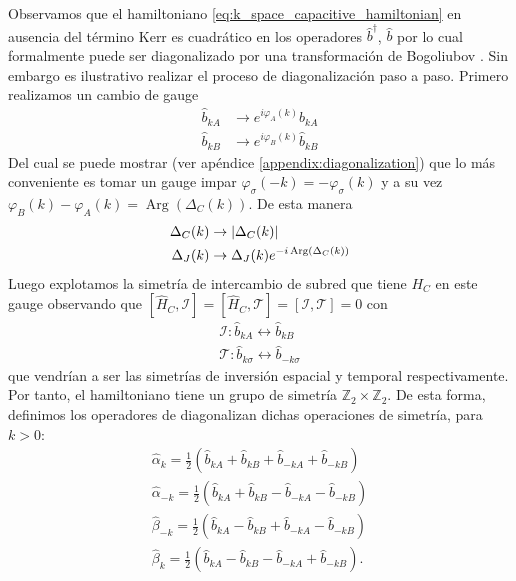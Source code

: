 Observamos que el hamiltoniano \eqref{eq:k_space_capacitive_hamiltonian} en ausencia del término Kerr es cuadrático en los operadores $\hat b^\dag$, $\hat b$ por lo cual formalmente puede ser diagonalizado por una transformación de Bogoliubov \cite{vanHemmen1980}. Sin embargo es ilustrativo realizar el proceso de diagonalización paso a paso. Primero realizamos un cambio de gauge 
\begin{subequations}
    \begin{align}
        \hat b_{kA} &\rightarrow e^{i\varphi_A(k)}\hat b_{kA}\\
        \hat b_{kB} &\rightarrow e^{i\varphi_B(k)}\hat b_{kB}
    \end{align}\label{eq:first_gauge}
\end{subequations}
Del cual se puede mostrar (ver apéndice \ref{appendix:diagonalization}) que lo más conveniente es tomar un gauge impar $\varphi_\sigma(-k) = - \varphi_\sigma(k)$ y a su vez $\varphi_B(k) - \varphi_A(k) = \operatorname{Arg}(\Delta_C(k))$. De esta manera 
\begin{subequations}
    \begin{align}
        \Delta_C(k)&\rightarrow \abs{\Delta_C(k)}\\
        \Delta_J(k)&\rightarrow \Delta_J(k)e^{-i\operatorname{Arg}(\Delta_C(k))}
    \end{align}
\end{subequations}
Luego explotamos la simetría de intercambio de subred que tiene $H_C$ en este gauge observando que $\left[\hat H_C, \mathcal I\right] = \left[\hat H_C, \mathcal T\right] = \left[\mathcal I, \mathcal T\right] =  0$ con 
\begin{subequations}
    \begin{align}
        \mathcal I : \hat b_{kA} \leftrightarrow \hat b_{kB}\\
        \mathcal T: \hat b_{k\sigma} \leftrightarrow \hat b_{-k\sigma}
    \end{align}\label{eq:symmetries}
\end{subequations}
que vendrían a ser las simetrías de inversión espacial y temporal respectivamente. Por tanto, el hamiltoniano tiene un grupo de simetría $\mathbb Z_2 \times \mathbb Z_2$. De esta forma, definimos los operadores de diagonalizan dichas operaciones de simetría, para $k > 0$:
\begin{subequations}
    \begin{align}
        \hat \alpha_{k} = \frac{1}{2}\left(\hat b_{kA} + \hat b_{kB} + \hat b_{-kA} + \hat b_{-kB}\right)\\
        \hat \alpha_{-k} = \frac{1}{2}\left(\hat b_{kA} + \hat b_{kB} - \hat b_{-kA} - \hat b_{-kB}\right)\\
        \hat \beta_{-k} = \frac{1}{2}\left(\hat b_{kA} - \hat b_{kB} + \hat b_{-kA} - \hat b_{-kB}\right)\\
        \hat \beta_{k} = \frac{1}{2}\left(\hat b_{kA} - \hat b_{kB} - \hat b_{-kA} + \hat b_{-kB}\right).
    \end{align}
\end{subequations}
